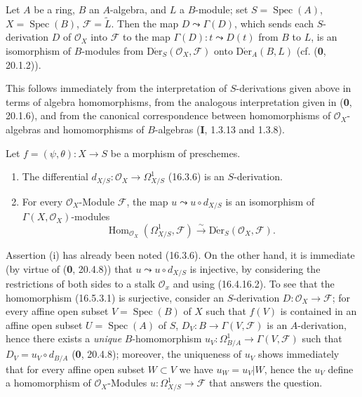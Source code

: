 \begin{proposition}[16.5.2]
\label{IV.16.5.2}
Let $A$ be a ring, $B$ an $A$-algebra, and $L$ a $B$-module; set
$S=\operatorname{Spec}(A)$, $X=\operatorname{Spec}(B)$,
$\mathscr{F}=\widetilde{L}$. Then the map $D\leadsto\Gamma(D)$, which sends
each $S$-derivation $D$ of $\mathcal{O}_X$ into $\mathscr{F}$ to the map
$\Gamma(D):t\leadsto D(t)$ from $B$ to $L$, is an
isomorphism of $B$-modules from
$\operatorname{D\acute{e}r}_S(\mathcal{O}_X,\mathscr{F})$ onto
$\operatorname{D\acute{e}r}_A(B,L)$ (cf. \textup{(\textbf{0}, 20.1.2)}).
\end{proposition}

This follows immediately from the interpretation of $S$-derivations given above
in terms
of algebra homomorphisms, from the analogous interpretation given in
(\textbf{0}, 20.1.6), and from the canonical correspondence between homomorphisms of
$\mathcal{O}_X$-algebras and homomorphisms of $B$-algebras (\textbf{I}, 1.3.13 and
1.3.8).

\begin{proposition}[16.5.3]
\label{IV.16.5.3}
Let $f=(\psi,\theta):X\to S$ be a morphism of preschemes.
\begin{enumerate}
\item[\textup{(i)}] The differential
$d_{X/S}:\mathcal{O}_X\to\varOmega_{X/S}^1$ \textup{(16.3.6)} is an $S$-derivation.
\item[\textup{(ii)}] For every $\mathcal{O}_X$-Module $\mathscr{F}$, the map
$u\leadsto u\circ d_{X/S}$ is an isomorphism of
$\Gamma(X,\mathcal{O}_X)$-modules
\[
  \operatorname{Hom}_{\mathcal{O}_X}(\varOmega_{X/S}^1,\mathscr{F})
  \xrightarrow{\sim}
  \operatorname{D\acute{e}r}_S(\mathcal{O}_X,\mathscr{F}).
  \tag{16.5.3.1}
  \label{IV.16.5.3.1}
\]
\end{enumerate}
\end{proposition}

Assertion (i) has already been noted (16.3.6). On the other hand, it is immediate
(by virtue of (\textbf{0}, 20.4.8)) that $u\leadsto u\circ d_{X/S}$ is injective, by
considering the restrictions of both sides to a stalk $\mathcal{O}_x$ and
using (16.4.16.2). To see that the homomorphism (16.5.3.1) is surjective,
consider an $S$-derivation $D:\mathcal{O}_X\to\mathscr{F}$; for every
affine open subset $V=\operatorname{Spec}(B)$ of $X$ such that $f(V)$ is contained
in an affine open subset $U=\operatorname{Spec}(A)$ of $S$,
$D_V:B\to\Gamma(V,\mathscr{F})$ is an $A$-derivation, hence there exists a
\emph{unique} $B$-homomorphism
$u_V:\Omega_{B/A}^1\to\Gamma(V,\mathscr{F})$ such that
$D_V=u_V\circ d_{B/A}$ (\textbf{0}, 20.4.8); moreover, the uniqueness of $u_V$ shows
immediately that for every affine open subset $W\subset V$ we have $u_W=u_V|W$, hence
the $u_V$ define a homomorphism of $\mathcal{O}_X$-Modules
$u:\varOmega_{X/S}^1\to\mathscr{F}$ that answers the question.

